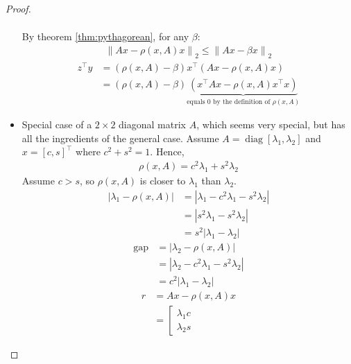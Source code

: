 \documentclass[11pt]{article}
\numberwithin{equation}{section}
\begin{document}
\begin{theorem}
\begin{proof}
\begin{itemize}
\begin{align*}
            \end{align*}
            By theorem \ref{thm:pythagorean}, for any $\beta$: \begin{align*}
                \left\|Ax-\rho(x,A){x}\right\|_{2} \leq \left\|Ax-\beta x\right\|_{2}
            \end{align*}
            \begin{align*}
                z^\top y &= \left( \rho(x,A) - \beta \right)x^\top \left( Ax - \rho(x,A){x} \right) \\
                &= \left( \rho(x,A) - \beta \right) \underbrace{\left( x^\top Ax - \rho(x,A) x^\top x \right)}_{\text{equals }0 \text{ by the definition of }\rho(x,A)}
            \end{align*}
            \item Special case of a $2 \times 2$ diagonal matrix $A$, which seems very special, but has all the ingredients of the general case.
            Assume $A = \operatorname{diag}[\lambda_1,\lambda_2]$ and $x = [c,s]^\top$ where $c^{2}+s^{2}=1$. Hence, \begin{align*}
                \rho(x, A) = c^{2} \lambda_{1}+s^{2} \lambda_{2}
            \end{align*}
            Assume $c > s$, so $\rho(x, A)$ is closer to $\lambda_1$ than $\lambda_2$. \begin{align*}
                \left|\lambda_{1}-\rho(x, A)\right| &= \left|\lambda_{1} -c^{2} \lambda_{1} - s^{2} \lambda_{2}\right| \\
                &= \left|s^{2} \lambda_{1} - s^{2} \lambda_{2} \right| \\
                &= s^{2} \left| \lambda_{1} - \lambda_{2} \right|
            \end{align*}
            \begin{align*}
                \operatorname{gap} &= \left| \lambda_{2} - \rho(x, A) \right| \\
                &= \left| \lambda_{2} - c^{2} \lambda_{1} - s^{2} \lambda_{2} \right| \\
                &= c^{2} \left| \lambda_{1} - \lambda_{2} \right|
            \end{align*}
            \begin{align*}
                r &= Ax - \rho(x,A)x \\
                &= \left[\begin{array}{l}
                    \lambda_{1} c \\
                    \lambda_{2} s

\end{array}
\end{align*}
\end{itemize}
\end{proof}
\end{theorem}
\end{document}
